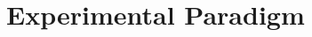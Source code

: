 \documentclass[journal,twocolumn]{IEEEtran}
\begin{document}






\section{Experimental Paradigm} \label{sect:conclusion}
\end{document}
